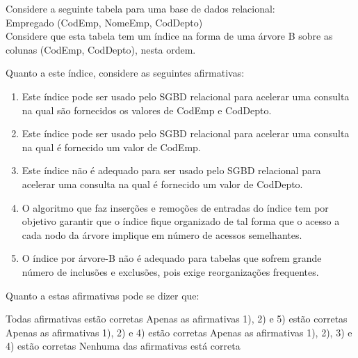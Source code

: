 \documentclass[12pt, addpoints]{exam}
\begin{document}
    \begin{questions}

    \newpage
    \question

Considere a seguinte tabela para uma base de dados relacional:\\

Empregado (CodEmp, NomeEmp, CodDepto)\\

Considere que esta tabela tem um índice na forma de uma árvore B sobre as colunas (CodEmp, CodDepto), nesta ordem.

Quanto a este índice, considere as seguintes afirmativas:

\begin{enumerate}

    \item Este índice pode ser usado pelo SGBD relacional para acelerar uma consulta na qual são fornecidos os valores de CodEmp e CodDepto.

    \item Este índice pode ser usado pelo SGBD relacional para acelerar uma consulta na qual é fornecido um valor de CodEmp.

    \item Este índice não é adequado para ser usado pelo SGBD relacional para acelerar uma consulta na qual é fornecido um valor de CodDepto.

    \item O algoritmo que faz inserções e remoções de entradas do índice tem por objetivo garantir que o índice fique organizado de tal forma que o acesso a cada nodo da árvore implique em número de acessos semelhantes.

    \item O índice por árvore-B não é adequado para tabelas que sofrem grande número de inclusões e exclusões, pois exige reorganizações frequentes.

\end{enumerate}





Quanto a estas afirmativas pode se dizer que:
\begin{choices}
\choice Todas afirmativas estão corretas
\choice Apenas as afirmativas 1), 2) e 5) estão corretas
\choice Apenas as afirmativas 1), 2) e 4) estão corretas
\choice Apenas as afirmativas 1), 2), 3) e 4) estão corretas
\choice Nenhuma das afirmativas está correta
\end{choices}


\end{questions}
\end{document}
